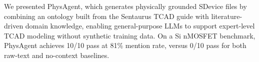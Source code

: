 We presented PhysAgent, which generates physically grounded SDevice files by combining {\color{red}an ontology built from the Sentaurus TCAD guide} with literature-driven domain knowledge, enabling general-purpose LLMs to support expert-level TCAD modeling without synthetic training data. On a Si nMOSFET benchmark, PhysAgent achieves {\color{red}10/10 pass} at 81\% {\color{red}mention rate}, versus {\color{red}0/10 pass} for both raw-text and no-context baselines.
